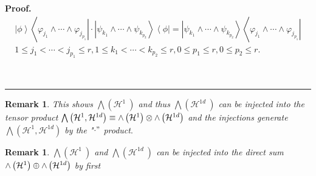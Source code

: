\documentclass[aps,preprint]{revtex4}%
\newtheorem{remark}[theorem]{Remark}
\newenvironment{proof}[1][Proof]{\noindent\textbf{#1.} }{\ \rule{0.5em}{0.5em}}
\begin{document}
\begin{proof}%
\begin{gather}
\left\vert \phi\right\rangle \left\langle \varphi_{j_{1}}\wedge\cdots
\wedge\varphi_{j_{p_{1}}}\right\vert \cdot\left\vert \psi_{k_{1}}\wedge
\cdots\wedge\psi_{k_{p_{2}}}\right\rangle \left\langle \phi\right\vert
=\left\vert \psi_{k_{1}}\wedge\cdots\wedge\psi_{k_{p_{2}}}\right\rangle
\left\langle \varphi_{j_{1}}\wedge\cdots\wedge\varphi_{j_{p_{1}}}\right\vert
\\
1\leq j_{1}<\cdots<j_{p_{1}}\leq r,1\leq k_{1}<\cdots<k_{p_{2}}\leq r,0\leq
p_{1}\leq r,0\leq p_{2}\leq r.
\end{gather}

\end{proof}

\begin{remark}
This shows $%
{\textstyle\bigwedge}
\left(  \mathcal{H}^{1}\ \right)  $ and thus $%
{\textstyle\bigwedge}
\left(  \mathcal{H}^{1d}\ \right)  $ \emph{can be injected} into the
\emph{tensor product} $%
{\textstyle\bigwedge}
\left(  \mathcal{H}^{1},\mathcal{H}^{1d}\right)  \equiv{\huge \wedge}\left(
\mathcal{H}^{1}\right)  \otimes{\huge \wedge}\left(  \mathcal{H}^{1d}\right)
$ and the injections \emph{generate} $%
{\textstyle\bigwedge}
\left(  \mathcal{H}^{1},\mathcal{H}^{1d}\right)  $ by the "$\cdot"$ product$.$
\end{remark}

\begin{remark}
$%
{\textstyle\bigwedge}
\left(  \mathcal{H}^{1}\ \right)  $ and $%
{\textstyle\bigwedge}
\left(  \mathcal{H}^{1d}\ \right)  $ can be injected into the \emph{direct
sum} ${\huge \wedge}\left(  \mathcal{H}^{1}\right)  \oplus{\huge \wedge
}\left(  \mathcal{H}^{1d}\right)  $ by first
\end{remark}
\end{document}
